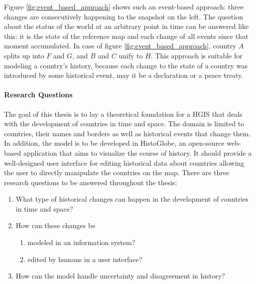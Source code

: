 Figure \ref{fig:event_based_approach} shows such an event-based approach: three changes are consecutively happening to the snapshot on the left. The question about the status of the world at an arbitrary point in time can be answered like this: it is the state of the reference map and each change of all events since that moment accumulated. In case of figure \ref{fig:event_based_approach}, country $A$ splits up into $F$ and $G$, and $B$ and $C$ unify to $H$. This approach is suitable for modeling a country's history, because each change to the state of a country was introduced by some historical event, may it be a declaration or a peace treaty.

\newpage
\paragraph{Research Questions} %
\label{par:research_questions}

The goal of this thesis is to lay a theoretical foundation for a HGIS that deals with the development of countries in time and space. The domain is limited to countries, their names and borders as well as historical events that change them. In addition, the model is to be developed in HistoGlobe, an open-source web-based application that aims to visualize the course of history. It should provide a well-designed user interface for editing historical data about countries allowing the user to directly manipulate the countries on the map. There are three research questions to be answered throughout the thesis:

\begin{enumerate}
  \item What type of historical changes can happen in the development of countries in time and space?
  \item How can these changes be
  \begin{enumerate}
    \item modeled in an information system?
    \item edited by humans in a user interface?
  \end{enumerate}
  \item How can the model handle uncertainty and disagreement in history?
\end{enumerate}


